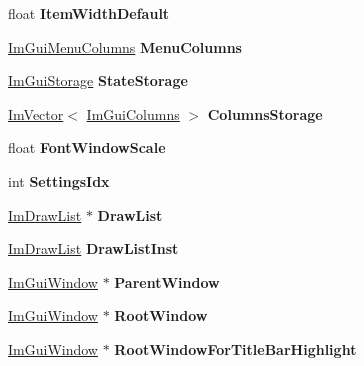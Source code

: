 \begin{DoxyCompactItemize}
float {\bfseries Item\+Width\+Default}
\item 
\mbox{\label{structImGuiWindow_a216bcecc3e90eb1c166d147bb6666322}} 
\hyperlink{structImGuiMenuColumns}{Im\+Gui\+Menu\+Columns} {\bfseries Menu\+Columns}
\item 
\mbox{\label{structImGuiWindow_a2151ab67f2624bd606883ad346179486}} 
\hyperlink{structImGuiStorage}{Im\+Gui\+Storage} {\bfseries State\+Storage}
\item 
\mbox{\label{structImGuiWindow_a3a1b708552d838c7b2c4eded52c80cae}} 
\hyperlink{structImVector}{Im\+Vector}$<$ \hyperlink{structImGuiColumns}{Im\+Gui\+Columns} $>$ {\bfseries Columns\+Storage}
\item 
\mbox{\label{structImGuiWindow_a566ce9268a466afbbec78532d5cfa3c9}} 
float {\bfseries Font\+Window\+Scale}
\item 
\mbox{\label{structImGuiWindow_add0518a4c1e784476a51f4d3af201e0f}} 
int {\bfseries Settings\+Idx}
\item 
\mbox{\label{structImGuiWindow_a39de4668b09754136c6fd7ab89ab674a}} 
\hyperlink{structImDrawList}{Im\+Draw\+List} $\ast$ {\bfseries Draw\+List}
\item 
\mbox{\label{structImGuiWindow_aa99947e76fbf897c02ce1de44c202031}} 
\hyperlink{structImDrawList}{Im\+Draw\+List} {\bfseries Draw\+List\+Inst}
\item 
\mbox{\label{structImGuiWindow_a5f0b37cb12fbeb3efe00d0cd826d5d65}} 
\hyperlink{structImGuiWindow}{Im\+Gui\+Window} $\ast$ {\bfseries Parent\+Window}
\item 
\mbox{\label{structImGuiWindow_aef9281297b0993c8f1b7c1ff7987cb61}} 
\hyperlink{structImGuiWindow}{Im\+Gui\+Window} $\ast$ {\bfseries Root\+Window}
\item 
\mbox{\label{structImGuiWindow_ae5d5c6637b63f35edc415162a5674c1e}} 
\hyperlink{structImGuiWindow}{Im\+Gui\+Window} $\ast$ {\bfseries Root\+Window\+For\+Title\+Bar\+Highlight}

\end{DoxyCompactItemize}
